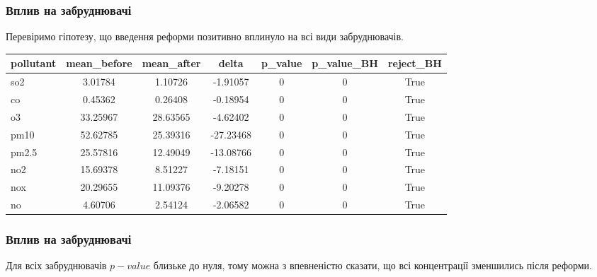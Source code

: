 \documentclass{beamer}
\begin{document}
\begin{frame}
  \frametitle{Вплив на забруднювачі}

  Перевіримо гіпотезу, що введення реформи позитивно вплинуло на всі види забруднювачів.

  \begin{tabular}{lcccccc}
    \hline
    pollutant & mean\_before & mean\_after & delta     & p\_value     & p\_value\_BH & reject\_BH \\
    \hline
    so2       &  3.01784     &  1.10726    &  -1.91057 & 0            & 0            & True       \\
    co        &  0.45362     &  0.26408    &  -0.18954 & 0            & 0            & True       \\
    o3        & 33.25967     & 28.63565    &  -4.62402 & 0            & 0            & True       \\
    pm10      & 52.62785     & 25.39316    & -27.23468 & 0            & 0            & True       \\
    pm2.5     & 25.57816     & 12.49049    & -13.08766 & 0            & 0            & True       \\
    no2       & 15.69378     &  8.51227    &  -7.18151 & 0            & 0            & True       \\
    nox       & 20.29655     & 11.09376    &  -9.20278 & 0            & 0            & True       \\
    no        &  4.60706     &  2.54124    &  -2.06582 & 0            & 0            & True       \\
    \hline
  \end{tabular}
  
\end{frame}

\begin{frame}
  \frametitle{Вплив на забруднювачі}

  Для всіх забруднювачів $p-value$ близьке до нуля, тому можна з впевненістю сказати, що всі концентрації зменшились після реформи.
\end{frame}
\end{document}
